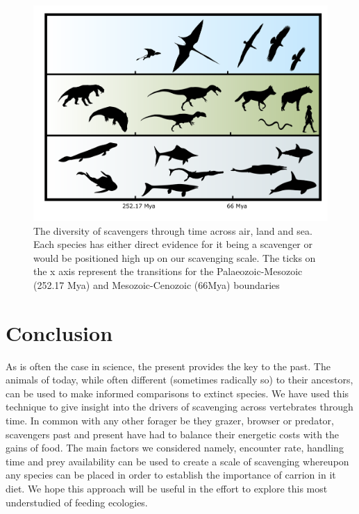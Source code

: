 \documentclass[a4paper,12pt]{article}
\begin{document}
\begin{figure}[!htbp]
\centering
   \includegraphics[width=1\textwidth]{timeline_figure/timeLine.pdf}
\caption{The diversity of scavengers through time across air, land and sea. Each species has either direct evidence for it being a scavenger or would be positioned high up on our scavenging scale. The ticks on the x axis represent the transitions for the Palaeozoic-Mesozoic (252.17 Mya) and Mesozoic-Cenozoic (66Mya) boundaries}
\label{Timeline}
\end{figure}


\section*{Conclusion} 
As is often the case in science, the present provides the key to the past.
The animals of today, while often different (sometimes radically so) to their ancestors, can be used to make informed comparisons to extinct species. 
We have used this technique to give insight into the drivers of scavenging across vertebrates through time.
In common with any other forager be they grazer, browser or predator, scavengers past and present have had to balance their energetic costs with the gains of food. 
The main factors we considered namely, encounter rate, handling time and prey availability can be used to create a scale of scavenging whereupon any species can be placed in order to establish the importance of carrion in it diet.
We hope this approach will be useful in the effort to explore this most understudied of feeding ecologies. 
\end{document}
